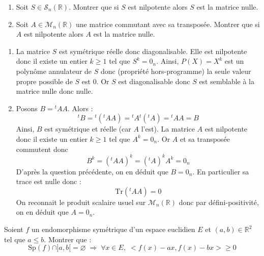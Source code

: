 \documentclass[a4paper,10pt]{report}
\begin{document}
\begin{Exercice}{}
\begin{enumerate}
\item Soit $S \in \mathcal{S}_n(\mathbb{R})$. Montrer que si $S$ est nilpotente alors $S$ est la matrice nulle.
\item Soit $A \in \mathcal{M}_n(\mathbb{R})$ une matrice commutant avec sa transposée. Montrer que si $A$ est nilpotente alors $A$ est la matrice nulle. 
\end{enumerate}
\end{Exercice}

\corr

\begin{enumerate}
\item La matrice $S$ est symétrique réelle donc diagonalisable. Elle est nilpotente donc il existe un entier $k \geq 1$ tel que $S^k=0_n$. Ainsi, $P(X)=X^k$ est un polynôme annulateur de $S$ donc (propriété hors-programme) la seule valeur propre possible de $S$ est $0$. Or $S$ est diagonalisable donc $S$ est semblable à la matrice nulle donc nulle.
\item Posons $B= {}^t A A$. Alors :
$$ {}^t B = {}^t ({}^t A A) = {}^t A {}^t({}^tA) = {}^tA A = B$$
Ainsi, $B$ est symétrique et réelle (car $A$ l'est). La matrice $A$ est nilpotente donc il existe un entier $k \geq 1$ tel que $A^k=0_n$. Or $A$ et sa transposée commutent donc 
$$ B^k = ({}^t A A)^k = ({}^t A)^k A^k = 0_n$$
D'après la question précédente, on en déduit que $B=0_n$. En particulier sa trace est nulle donc :
$$ \textrm{Tr}({}^t A A) = 0$$
On reconnait le produit scalaire usuel sur $\mathcal{M}_n(\mathbb{R})$ donc par défini-positivité, on en déduit que $A=0_n$.
\end{enumerate}

\begin{Exercice}{} Soient $f$ un endomorphisme symétrique d'un espace euclidien $E$ et $(a,b) \in \mathbb{R}^2$ tel que $a \leq b$. Montrer que :
$$ \textrm{Sp}(f) \cap ]a,b[ = \varnothing \; \Longrightarrow \; \forall x \in E, \; <f(x)-ax,f(x)-bx> \geq 0$$
\end{Exercice}
\end{document}
